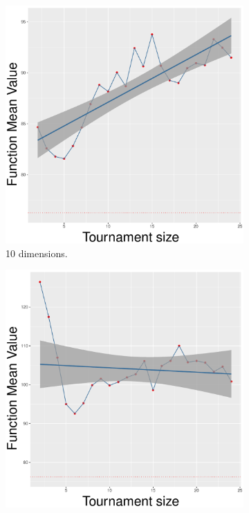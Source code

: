 \begin{figure}[!t]
	\begin{subfigure}[b]{0.33\textwidth}
		\centering
		\includegraphics[width=\textwidth]{img/SBX-10D/unimodal_sbx_11_dim_10.pdf}
		\caption{10 dimensions.}
	\end{subfigure}
	\begin{subfigure}[b]{0.33\textwidth}
		\centering
		\includegraphics[width=\textwidth]{img/SBX-20D/unimodal_sbx_11_dim_20.pdf}

\end{subfigure}
\end{figure}
